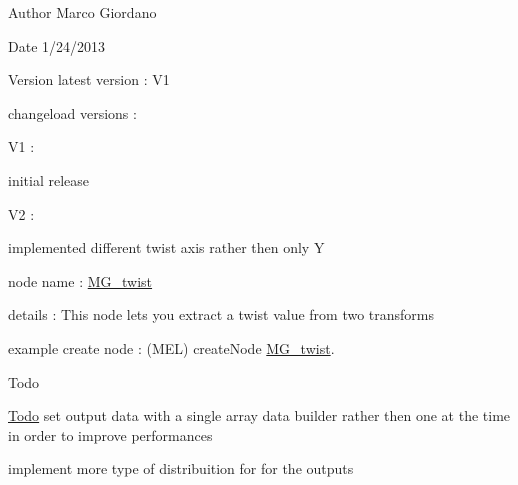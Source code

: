 \begin{DoxyAuthor}{Author}
Marco Giordano 
\end{DoxyAuthor}
\begin{DoxyDate}{Date}
1/24/2013 
\end{DoxyDate}
\begin{DoxyVersion}{Version}
latest version \-: V1 

changeload versions \-: \par
 V1 \-: \par

\begin{DoxyItemize}
\item initial release \par
 V2 \-: \par

\item implemented different twist axis rather then only Y \par
 node name \-: \hyperlink{class_m_g__twist}{M\-G\-\_\-twist}
\end{DoxyItemize}
\end{DoxyVersion}
details \-: This node lets you extract a twist value from two transforms

example create node \-: (M\-E\-L) create\-Node \hyperlink{class_m_g__twist}{M\-G\-\_\-twist}.

\begin{DoxyRefDesc}{Todo}
\item[\hyperlink{todo__todo000011}{Todo}]set output data with a single array data builder rather then one at the time in order to improve performances 

implement more type of distribuition for for the outputs\end{DoxyRefDesc}


